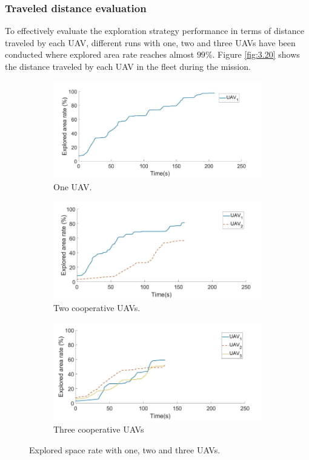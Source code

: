 \documentclass[11pt,openany]{book}
\begin{document}
\subsubsection{Traveled distance evaluation}
To eﬀectively evaluate the exploration strategy performance in terms of distance traveled by each UAV, diﬀerent runs with one, two and three UAVs have been conducted where explored area rate reaches almost $99\%$. Figure \ref{fig:3.20} shows the distance traveled by each UAV in the ﬂeet during the mission.
\begin{figure}[H]
    \centering
    \begin{subfigure}[H]{0.7\linewidth}
        \includegraphics[width=\linewidth]{assets/3_18_a.png}
        \caption{{One UAV.}}
        \label{fig:3.18a}
    \end{subfigure}
    \begin{subfigure}[H]{0.7\linewidth}
        \includegraphics[width=\linewidth]{assets/3_18_b.png}
        \caption{{Two cooperative UAVs.}}
        \label{fig:3.18b}
    \end{subfigure}
    \begin{subfigure}[H]{0.7\linewidth}
        \includegraphics[width=\linewidth]{assets/3_18_c.png}
        \caption{{Three cooperative UAVs}}
        \label{fig:3.18c}
    \end{subfigure}
    \caption{Explored space rate with one, two and three UAVs.}
    \label{fig:3.18}
\end{figure}
\end{document}
